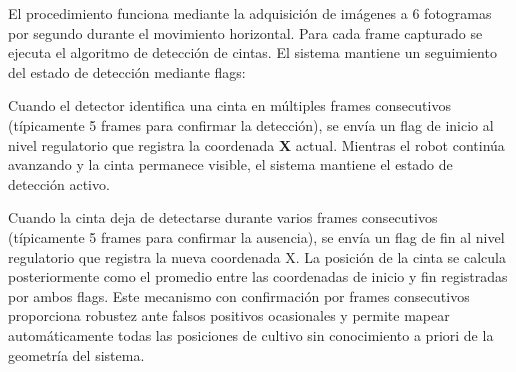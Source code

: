 El procedimiento funciona mediante la adquisición de imágenes a 6 fotogramas por segundo durante el movimiento horizontal. Para cada frame capturado se ejecuta el algoritmo de detección de cintas. El sistema mantiene un seguimiento del estado de detección mediante flags:

Cuando el detector identifica una cinta en múltiples frames consecutivos (típicamente 5 frames para confirmar la detección), se envía un flag de inicio al nivel regulatorio que registra la coordenada \textbf{X} actual. Mientras el robot continúa avanzando y la cinta permanece visible, el sistema mantiene el estado de detección activo.

Cuando la cinta deja de detectarse durante varios frames consecutivos (típicamente 5 frames para confirmar la ausencia), se envía un flag de fin al nivel regulatorio que registra la nueva coordenada X. La posición de la cinta se calcula posteriormente como el promedio entre las coordenadas de inicio y fin registradas por ambos flags. Este mecanismo con confirmación por frames consecutivos proporciona robustez ante falsos positivos ocasionales y permite mapear automáticamente todas las posiciones de cultivo sin conocimiento a priori de la geometría del sistema.